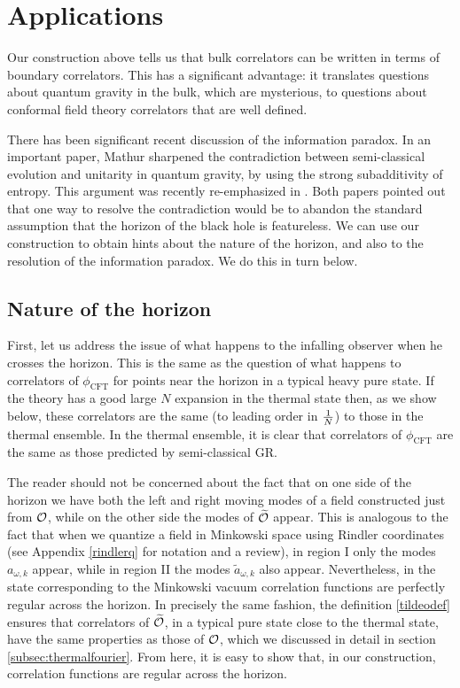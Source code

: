 \section{Applications \label{sec:applications}}
Our construction above tells us that bulk correlators can be written in terms of boundary correlators. This has a significant advantage: it translates questions about quantum gravity in the bulk, which are mysterious, to questions about conformal field theory correlators that are well defined. 

There has been significant recent discussion of the information paradox. In an important paper, Mathur \cite{Mathur:2009hf} sharpened the contradiction between semi-classical evolution and unitarity in quantum gravity, by using the strong subadditivity of entropy. This argument was recently re-emphasized in \cite{Almheiri:2012rt}. Both papers pointed out that one way to resolve the contradiction would be to abandon the standard assumption that the horizon of the black hole is featureless. We can use our construction to obtain hints about the nature of the horizon, and also to the resolution of the information paradox. We do this in turn below. 

\subsection{Nature of the horizon \label{subsechorizonnat}}

First, let us address the issue of what happens to the infalling observer when he crosses the horizon. This is the same as the question of what happens to correlators of $\phi_{\text{CFT}}$ for points near the horizon in a typical heavy pure state. If the theory has a good large $N$ expansion in the thermal state then, as we show below, these correlators are the same (to leading order in ${1 \over N}$) to those in the thermal ensemble. In the thermal ensemble, it is clear that correlators of $\phi_{\text{CFT}}$ are the same as those predicted by 
semi-classical GR. 

The reader should not be concerned about the fact that on one side of the horizon we have both the left and right moving modes of a field constructed just from ${\cal O}$,  while on the other side the modes of ${\widetilde{\cal{O}}}$ appear. 
This is analogous to the fact that when we quantize a field in Minkowski space using Rindler coordinates (see Appendix \ref{rindlerq} for notation and a review), in region I only the modes $a_{\omega,k}$ appear, while in region II the modes $\widetilde{a}_{\omega,k}$ also appear.  Nevertheless, in the state corresponding to the Minkowski vacuum correlation functions are perfectly regular across the horizon. 
In
precisely the same fashion, the definition \eqref{tildeodef} ensures that correlators of $\widetilde{\cal{O}}$, in a typical pure state close to the thermal state,  have the same properties as those of ${\cal{O}}$, which we discussed in detail in section \ref{subsec:thermalfourier}. From here, it is easy to show that, in our construction, correlation functions are regular across the horizon.

